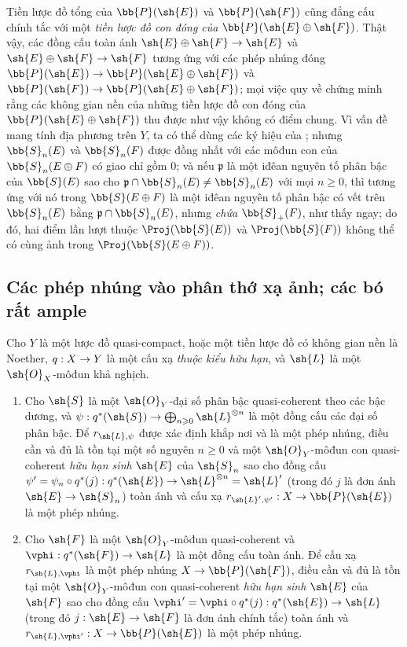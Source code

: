 \documentclass[oneside,10pt]{amsart}
\makeatletter
\renewcommand{\geq}{\geqslant}
\newcommand{\ega@arrow}[2]{\mathchoice{#1}{#2}{#2}{#2}}
\renewcommand{\to}{\ega@arrow{\longrightarrow}{\rightarrow}}
\newcommand{\oldpage}[2][]{\marginnote{\normalfont\footnotesize\textbf{#1}~|~#2}\ignorespaces}
\let\EGAOriginalLabel\label
\renewcommand{\label}[1]{\phantomsection\EGAOriginalLabel{#1}}
\makeatother
\begin{document}
\begin{remark}[4.3.6]
\label{II.4.3.6}
Tiền lược đồ tổng của $\bb{P}(\sh{E})$ và $\bb{P}(\sh{F})$ cũng đẳng cấu chính tắc với một \emph{tiền lược đồ con đóng của $\bb{P}(\sh{E}\oplus\sh{F})$}.
Thật vậy, các đồng cấu toàn ánh $\sh{E}\oplus\sh{F}\to\sh{E}$ và $\sh{E}\oplus\sh{F}\to\sh{F}$ tương ứng với các phép nhúng đóng $\bb{P}(\sh{E})\to\bb{P}(\sh{E}\oplus\sh{F})$ và $\bb{P}(\sh{F})\to\bb{P}(\sh{E}\oplus\sh{F})$;
mọi việc quy về chứng minh rằng các không gian nền của những tiền lược đồ con đóng của $\bb{P}(\sh{E}\oplus\sh{F})$ thu được như vậy không có điểm chung.
Vì vấn đề mang tính địa phương trên $Y$, ta có thể dùng các ký hiệu của ;
nhưng $\bb{S}_n(E)$ và $\bb{S}_n(F)$ được đồng nhất với các môđun con của $\bb{S}_n(E\oplus F)$ có giao chỉ gồm $0$;
và nếu $\mathfrak{p}$ là một iđêan nguyên tố phân bậc của $\bb{S}(E)$ sao cho $\mathfrak{p}\cap\bb{S}_n(E)\neq\bb{S}_n(E)$ với mọi $n\geq0$, thì tương ứng với nó trong $\bb{S}(E\oplus F)$ là một iđêan nguyên tố phân bậc có vết trên $\bb{S}_n(E)$ bằng $\mathfrak{p}\cap\bb{S}_n(E)$, nhưng \emph{chứa} $\bb{S}_+(F)$, như thấy ngay;
do đó, hai điểm lần lượt thuộc $\Proj(\bb{S}(E))$ và $\Proj(\bb{S}(F))$ không thể có cùng ảnh trong $\Proj(\bb{S}(E\oplus F))$.
\end{remark}

\subsection{Các phép nhúng vào phân thớ xạ ảnh; các bó rất ample}
\label{subsection:II.4.4}

\begin{proposition}[4.4.1]
\label{II.4.4.1}
Cho $Y$ là một lược đồ quasi-compact, hoặc một tiền lược đồ có không gian nền là Noether, $q:X\to Y$ là một cấu xạ \emph{thuộc kiểu hữu hạn}, và $\sh{L}$ là một $\sh{O}_X$-môđun khả nghịch.
\begin{enumerate}
  \item[\rm{(i)}] Cho $\sh{S}$ là một $\sh{O}_Y$-đại số phân bậc quasi-coherent theo các bậc dương, và $\psi:q^*(\sh{S})\to\bigoplus_{n\geq0}\sh{L}^{\otimes n}$ là một đồng cấu các đại số phân bậc.
    Để $r_{\sh{L},\psi}$ được xác định khắp nơi và là một phép nhúng, điều cần và
\oldpage[II]{79}
đủ là tồn tại một số nguyên $n\geq0$ và một $\sh{O}_Y$-môđun con quasi-coherent \emph{hữu hạn sinh} $\sh{E}$ của $\sh{S}_n$ sao cho đồng cấu $\psi'=\psi_n\circ q^*(j):q^*(\sh{E})\to\sh{L}^{\otimes n}=\sh{L}'$ (trong đó $j$ là đơn ánh $\sh{E}\to\sh{S}_n$) toàn ánh và cấu xạ $r_{\sh{L}',\psi'}:X\to\bb{P}(\sh{E})$ là một phép nhúng.
  \item[\rm{(ii)}] Cho $\sh{F}$ là một $\sh{O}_Y$-môđun quasi-coherent và $\vphi:q^*(\sh{F})\to\sh{L}$ là một đồng cấu toàn ánh.
    Để cấu xạ $r_{\sh{L},\vphi}$ là một phép nhúng $X\to\bb{P}(\sh{F})$, điều cần và đủ là tồn tại một $\sh{O}_Y$-môđun con quasi-coherent \emph{hữu hạn sinh} $\sh{E}$ của $\sh{F}$ sao cho đồng cấu $\vphi'=\vphi\circ q^*(j):q^*(\sh{E})\to\sh{L}$ (trong đó $j:\sh{E}\to\sh{F}$ là đơn ánh chính tắc) toàn ánh và $r_{\sh{L},\vphi'}:X\to\bb{P}(\sh{E})$ là một phép nhúng.
\end{enumerate}
\end{proposition}
\end{document}
